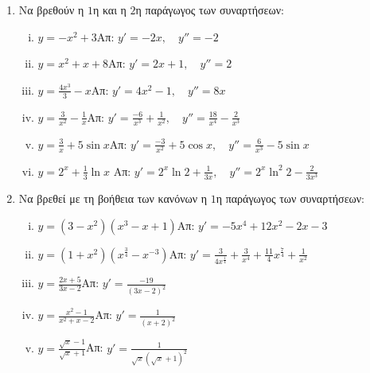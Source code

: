 


\pagestyle{askhseis}
\everymath{\displaystyle}




\begin{center}
  \minibox{\bfseries\large \textcolor{Col1}{Ασκήσεις στις Παραγώγους}}
\end{center}

\vspace{1cm}



\begin{enumerate}
\item Να βρεθούν η $1$η και η $2$η παράγωγος των συναρτήσεων:
\begin{enumerate}[i)]
\item $y=-x^2+3$\hfill Απ: $y'=-2x,\quad y''=-2$
\item $y=x^2+x+8$\hfill Απ: $y'=2x+1,\quad y''=2$
\item $y=\frac{4x^3}{3}-x$\hfill Απ: $y'=4x^2-1,\quad y''=8x$
\item $y= \frac{3}{x^{2}} -\frac{1}{x}$\hfill Απ: $y'=\frac{-6}{x^3}+\frac{1}{x^2},\quad y''= \frac{18}{x^4}-\frac{2}{x^3}$
\item $y=\frac{3}{x}+5\sin x$\hfill Απ: $y'=\frac{-3}{x^2}+5\cos x, \quad y'' = \frac{6}{x^{3}}
	-5 \sin{x}$ 
\item $ y = 2^{x} + \frac{1}{3} \ln{x} $ \hfill Απ: $ y' = 2^{x}\ln{2} + \frac{1}{3x}, \quad y'' =
	2^{x}\ln^{2}2 - \frac{2}{3x^{3}}  $
\end{enumerate}

\item Να βρεθεί με τη βοήθεια των κανόνων η $1$η παράγωγος των συναρτήσεων:

\begin{enumerate}[i)]
\item $y=(3-x^2)(x^3-x+1)$\hfill Απ: $y'=-5x^4+12x^2-2x-3$
\item $y=(1+x^2)(x^{\frac{3}{4}}-x^{-3})$\hfill Απ: $y'=\frac{3}{4x^{\frac{1}{4}}}+\frac{3}{x^4}+\frac{11}{4}x^{\frac{7}{4}}+\frac{1}{x^2}$
\item $y=\frac{2x+5}{3x-2}$\hfill Απ: $y'=\frac{-19}{(3x-2)^2}$
\item $y=\frac{x^2-1}{x^2+x-2}$\hfill Απ: $y'=\frac{1}{(x+2)^2}$
\item $y=\frac{\sqrt{x}-1}{\sqrt{x}+1}$\hfill Απ: $y'=\frac{1}{\sqrt{x}(\sqrt{x}+1)^2}$
\end{enumerate}


\end{enumerate}
